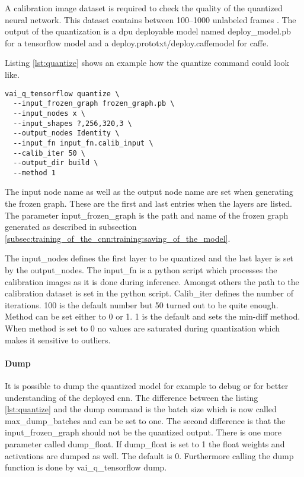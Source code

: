 A calibration image dataset is required to check the quality of the quantized neural network.
This dataset contains between \numrange{100}{1000} unlabeled frames \cite{vitis_ai_user_guide}.
The output of the quantization is a \acrshort{dpu} deployable model named deploy\_model.pb for a tensorflow model and a deploy.prototxt/deploy.caffemodel for caffe.

Listing \ref{lst:quantize} shows an example how the quantize command could look like.

\begin{lstlisting}[style=bash, caption={Quantize command}, label=lst:quantize]
  vai_q_tensorflow quantize \
  --input_frozen_graph frozen_graph.pb \
  --input_nodes x \
  --input_shapes ?,256,320,3 \
  --output_nodes Identity \
  --input_fn input_fn.calib_input \
  --calib_iter 50 \
  --output_dir build \
  --method 1
\end{lstlisting}

The input node name as well as the output node name are set when generating the frozen graph.
These are the first and last entries when the layers are listed.
The parameter input\_frozen\_graph is the path and name of the frozen graph generated as described in subsection \ref{subsec:training_of_the_cnn:training:saving_of_the_model}.

The input\_nodes defines the first layer to be quantized and the last layer is set by the output\_nodes.
The input\_fn is a python script which processes the calibration images as it is done during inference.
Amongst others the path to the calibration dataset is set in the python script.
Calib\_iter defines the number of iterations.
100 is the default number but 50 turned out to be quite enough.
Method can be set either to 0 or 1.
1 is the default and sets the min-diff method.
When method is set to 0 no values are saturated during quantization which makes it sensitive to outliers.

\paragraph{Dump}
It is possible to dump the quantized model for example to debug or for better understanding of the deployed \acrshort{cnn}.
The difference between the listing \ref{lst:quantize} and the dump command is the batch size which is now called max\_dump\_batches and can be set to one.
The second difference is that the input\_frozen\_graph should not be the quantized output.
There is one more parameter called dump\_float.
If dump\_float is set to 1 the float weights and activations are dumped as well.
The default is 0.
Furthermore calling the dump function is done by vai\_q\_tensorflow dump.

